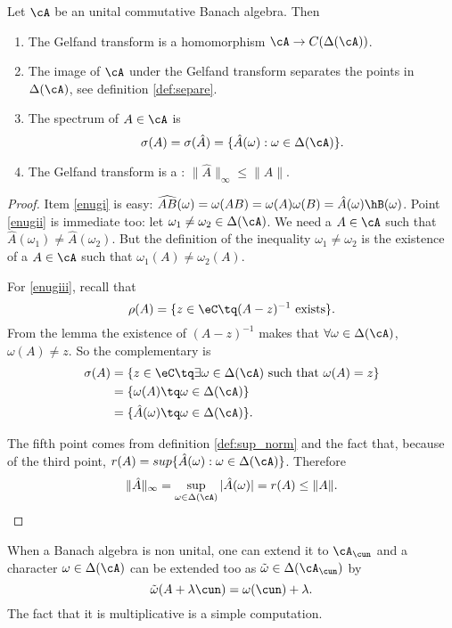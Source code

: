 \begin{theorem}
Let $\cA$ be an unital commutative Banach algebra. Then
\begin{enumerate}
\item The Gelfand transform is a homomorphism $\cA\to C(\Delta(\cA))$. \label{enugi}
\item The image of $\cA$ under the Gelfand transform separates the points in $\Delta(\cA)$, see definition \ref{def:separe}. \label{enugii}
\item \label{enugiii} The spectrum of $A\in\cA$ is 
\[
   \sigma(A)=\sigma(\hat A)=\{\hat A(\omega):\omega\in\Delta(\cA)\}.
\]
\item \label{enugiv} The Gelfand transform is a :   $\|\hat A\|_{\infty}\leq\|A\|$.
\end{enumerate}\label{tho:unital_comm}
\end{theorem}
\begin{proof}
Item \ref{enugi} is easy: $\widehat{AB}(\omega)=\omega(AB)=\omega(A)\omega(B)=\hat A(\omega)\hB(\omega)$. Point \ref{enugii} is immediate too: let $\omega_1\neq\omega_2\in\Delta(\cA)$. We need a $A\in\cA$ such that $\hat A(\omega_1)\neq\hat A(\omega_2)$. But the definition of the inequality $\omega_1\neq\omega_2$ is the existence of a $A\in\cA$ such that $\omega_1(A)\neq\omega_2(A)$.

For \ref{enugiii}, recall that
\[
  \rho(A)=\{z\in\eC\tq(A-z)^{-1}\textrm{ exists}\}.
\]
From the lemma the existence of $(A-z)^{-1}$ makes that $\forall\omega\in\Delta(\cA)$, $\omega(A)\neq z$. So the complementary is
\begin{equation}
\begin{split}
 \sigma(A)&=\{z\in\eC\tq\exists\omega\in\Delta(\cA)\textrm{ such that }\omega(A)=z\}\\
          &=\{\omega(A)\tq\omega\in\Delta(\cA)\}\\
          &=\{\hat A(\omega)\tq\omega\in\Delta(\cA)\}.
\end{split}
\end{equation}

The fifth point comes from definition \ref{def:sup_norm} and the fact that, because of the third point,  $r(A)=sup\{\hat A(\omega):\omega\in\Delta(\cA)\}$.
Therefore
\[
\|\hat A\|_{\infty}=\sup_{\omega\in\Delta(\cA)}|\hat A(\omega)|=r(A)\leq\|A\|.
\]
\end{proof}

When a Banach algebra is non unital, one can extend it to $\cA_{\cun}$ and a character $\omega\in\Delta(\cA)$ can be extended too as $\tilde{\omega}\in\Delta(\cA_{\cun})$ by
\[
  \tilde{\omega}(A+\lambda\cun)=\omega(\cun)+\lambda.
\]
The fact that it is multiplicative is a simple computation.

